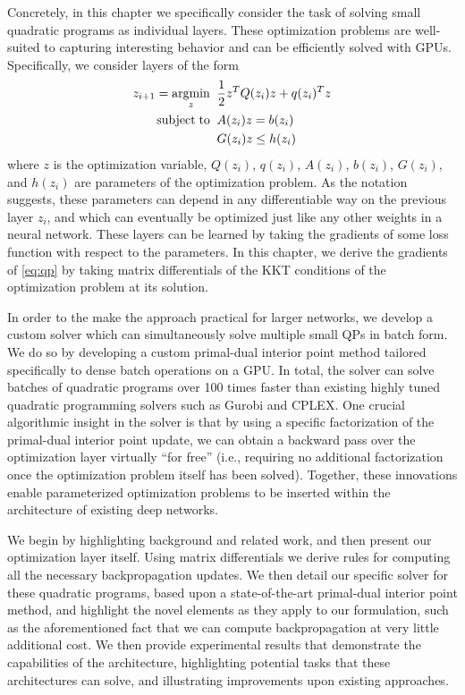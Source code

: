 Concretely, in this chapter we specifically consider the task of
solving small quadratic programs as individual layers.
These optimization problems are well-suited to capturing interesting
behavior and can be efficiently solved with GPUs.
Specifically, we consider layers of the form
\begin{equation}
    \begin{split}
        z_{i+1} = \operatorname*{argmin}_{z} \;\; & \frac{1} {2}z^T Q(z_i) z + q(z_i)^T z \\
        \operatorname*{subject\;to} \;\; & A(z_i) z  = b(z_i) \\
        & G(z_i) z \leq h(z_i)
    \end{split}
    \label{eq:qp}
\end{equation}
where $z$ is the optimization variable, $Q(z_i)$, $q(z_i)$, $A(z_i)$, $b(z_i)$,
$G(z_i)$, and $h(z_i)$ are parameters of the optimization problem.
As the notation suggests, these parameters can depend in any differentiable way
on the previous layer $z_i$, and which can eventually be optimized just like
any other weights in a neural network.  These layers can be learned by taking
the gradients of some loss function with respect to the parameters.
In this chapter, we derive the gradients of \eqref{eq:qp} by taking
matrix differentials of the KKT conditions of the optimization
problem at its solution.

In order to the make the approach practical for larger
networks, we develop a custom solver which can simultaneously solve multiple
small QPs in batch form.  We do so by developing a custom primal-dual
interior point method tailored specifically to dense batch operations on a GPU.
In total, the solver can solve batches of quadratic programs over 100 times
faster than
existing highly tuned quadratic programming solvers such as Gurobi and CPLEX.
One crucial algorithmic insight in the solver is that by using a
specific factorization of the primal-dual interior point update, we can obtain a
backward pass over the optimization layer virtually ``for free''
(i.e., requiring no additional factorization once the optimization problem itself
has been solved).
Together, these innovations enable parameterized optimization problems
to be inserted within the architecture of existing deep networks.

We begin by highlighting background and related work, and then present our
optimization layer itself.  Using matrix differentials we derive rules for
computing all the necessary backpropagation updates.  We then detail our
specific solver for these quadratic programs, based upon a
state-of-the-art primal-dual interior point method, and highlight the
novel elements as they apply to our formulation, such as the aforementioned fact
that we can compute backpropagation at very little additional cost.
We then provide experimental results that demonstrate the capabilities of the
architecture, highlighting potential tasks that these architectures can solve,
and illustrating improvements upon existing approaches.

